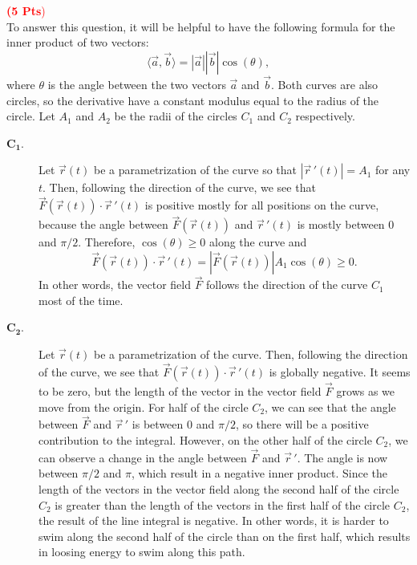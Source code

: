 \documentclass[12pt]{article}
\newcommand{\spc}{\vspace*{0.5cm}}
\newcommand{\exo}[3]{\noindent\textcolor{red}{\fbox{\textbf{Section {#1}, Problem {#2}}}\hrulefill   \textbf{({#3} Pts})}\vspace*{10pt}}
\begin{document}
	\newpage

	\exo{16.2}{18}{5}
	\\ 
	To answer this question, it will be helpful to have the following formula for the inner product of two vectors:
		\[
			\langle \vec{a} , \vec{b} \rangle = |\vec{a}| |\vec{b}| \cos (\theta ) ,
		\]
	where $\theta$ is the angle between the two vectors $\vec{a}$ and $\vec{b}$. Both curves are also circles, so the derivative have a constant modulus equal to the radius of the circle. Let $A_1$ and $A_2$ be the radii of the circles $C_1$ and $C_2$ respectively. 

	\begin{description}
		\item[$\mathbf{C_1}$.] Let $\vec{r} (t)$ be a parametrization of the curve so that $|\vec{r}\,' (t)| = A_1$ for any $t$. Then, following the direction of the curve, we see that $\vec{F} (\vec{r} (t)) \cdot \vec{r} \, ' (t)$ is positive mostly for all positions on the curve, because the angle between $\vec{F} (\vec{r} (t))$ and $\vec{r} \, ' (t)$ is mostly between $0$ and $\pi/2$. Therefore, $\cos (\theta ) \geq 0$ along the curve and
			$$ 
			\vec{F} (\vec{r} (t)) \cdot \vec{r} \, ' (t) = | \vec{F} (\vec{r} (t))| A_1 \cos (\theta ) \geq 0 .
			$$ 
		In other words, the vector field $\vec{F}$ follows the direction of the curve $C_1$ most of the time.
		\item[$\mathbf{C_2}$.] Let $\vec{r} (t)$ be a parametrization of the curve. Then, following the direction of the curve, we see that $\vec{F} (\vec{r} (t)) \cdot \vec{r} \, ' (t)$ is globally negative. It seems to be zero, but the length of the vector in the vector field $\vec{F}$ grows as we move from the origin. For half of the circle $C_2$, we can see that the angle between $\vec{F}$ and $\vec{r}\,'$ is between $0$ and $\pi/2$, so there will be a positive contribution to the integral. However, on the other half of the circle $C_2$, we can observe a change in the angle between $\vec{F}$ and $\vec{r}\,'$. The angle is now between $\pi/2$ and $\pi$, which result in a negative inner product. Since the length of the vectors in the vector field along the second half of the circle $C_2$ is greater than the length of the vectors in the first half of the circle $C_2$, the result of the line integral is negative. In other words, it is harder to swim along the second half of the circle than on the first half, which results in loosing energy to swim along this path.
	\end{description}

	\spc 
\end{document}
